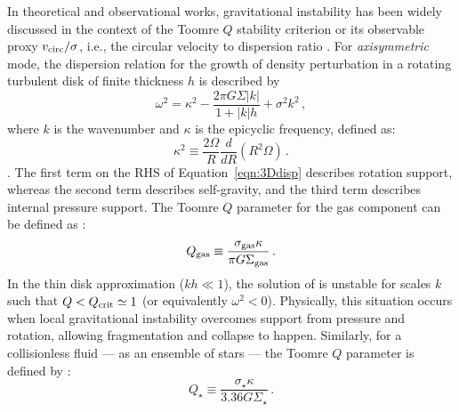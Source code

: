 \IfFileExists{emulateapjlegacy.cls}{\documentclass[iop]{emulateapjlegacy}}{\documentclass[iop]{emulateapj}}
\begin{document}
In theoretical and observational works, gravitational instability has been widely discussed in the context of the Toomre $Q$ stability criterion \citep{Toomre64a, Goldreich65b} or its observable proxy  $v_{\rm circ}/\sigma$, i.e., the circular velocity to dispersion ratio \citep[e.g.,][]{GarciaBurillo03a, Genzel11a, Kassin12a, Leung19a}.
%
For {\it axisymmetric} mode, the dispersion relation for the growth of density perturbation in a rotating turbulent disk of finite thickness $h$ is described by
\begin{equation}
\omega^2 = \kappa^2 - \frac{2\pi G \Sigma |k|}{1 + |k| h} + \sigma^2 k^2\,,
\label{eqn:3Ddisp}
\end{equation}
where $k$ is the wavenumber and $\kappa$ is the epicyclic frequency, defined as:
\begin{equation}
\kappa^2\equiv\frac{2\Omega}{R}\frac{d}{dR}\left(R^2\Omega\right)\,.
\label{eqn:kappa}
\end{equation}
\citep{Romeo92a}.
The first term on the RHS of Equation~\ref{eqn:3Ddisp} describes rotation support, whereas the second term describes self-gravity, and the third term describes internal pressure support. The Toomre $Q$ parameter for the gas component can be defined as \citep{Toomre64a}:
\begin{equation}
Q_{\rm gas}\equiv\frac{\sigma_{\rm gas}\kappa}{\pi G \Sigma_{\rm gas}}\,.
\label{eqn:Q}
\end{equation}
In the thin disk approximation ($kh\ll1$), the solution of  is unstable for scales $k$ such that $Q < Q_{\rm crit}\simeq1$ (or equivalently $\omega^2 < 0$). Physically, this situation occurs when local gravitational instability
overcomes support from pressure and rotation, allowing fragmentation and collapse to happen. Similarly, for a collisionless fluid --- as an ensemble of stars --- the Toomre $Q$ parameter is defined by \citep{Toomre64a}:
\begin{equation}
Q_{\star} \equiv\frac{\sigma_{\star}\kappa}{3.36 G \Sigma_{\star}}\,.
\end{equation}
\end{document}
